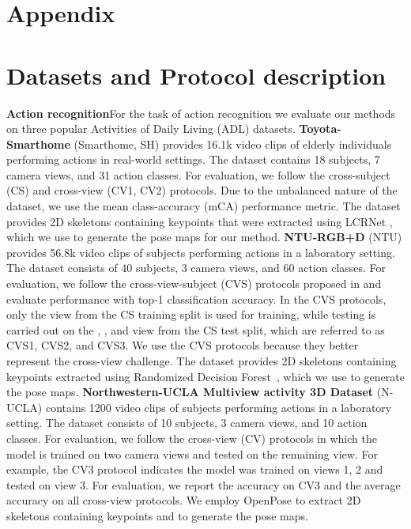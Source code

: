 \documentclass{article}
\begin{document}



\newpage
\section*{\Large Appendix}
\appendix

\section{Datasets and Protocol description}
\textbf{Action recognition}\quad For the task of action recognition we evaluate our methods on three popular Activities of Daily Living (ADL) datasets. \textbf{Toyota-Smarthome}\cite{smarthome} (Smarthome, SH) provides 16.1k video clips of elderly individuals performing actions in real-world settings. The dataset contains 18 subjects, 7 camera views, and 31 action classes. For evaluation, we follow the cross-subject (CS) and cross-view (CV1, CV2) protocols. Due to the unbalanced nature of the dataset, we use the mean class-accuracy (mCA) performance metric. The dataset provides 2D skeletons containing  keypoints that were extracted using LCRNet \cite{lcrnet_new}, which we use to generate the pose maps for our method. \textbf{NTU-RGB+D}\cite{NTU_RGB+D} (NTU) provides 56.8k video clips of subjects performing actions in a laboratory setting. The dataset consists of 40 subjects, 3 camera views, and 60 action classes. For evaluation, we follow the cross-view-subject (CVS) protocols proposed in \cite{varol21_surreact} and evaluate performance with top-1 classification accuracy. In the CVS protocols, only the  view from the CS training split is used for training, while testing is carried out on the , , and  view from the CS test split, which are referred to as CVS1, CVS2, and CVS3. We use the CVS protocols because they better represent the cross-view challenge. The dataset provides 2D skeletons containing  keypoints extracted using Randomized Decision Forest~\cite{37}, which we use to generate the pose maps. \textbf{Northwestern-UCLA Multiview activity 3D Dataset}\cite{nucla} (N-UCLA) contains 1200 video clips of subjects performing actions in a laboratory setting. The dataset consists of 10 subjects, 3 camera views, and 10 action classes. For evaluation, we follow the cross-view (CV) protocols in which the model is trained on two camera views and tested on the remaining view. For example, the CV3 protocol indicates the model was trained on views 1, 2 and tested on view 3. For evaluation, we report the accuracy on CV3 and the average accuracy on all cross-view protocols. We employ OpenPose \cite{OpenPose} to extract 2D skeletons containing  keypoints and to generate the pose maps.
\end{document}
